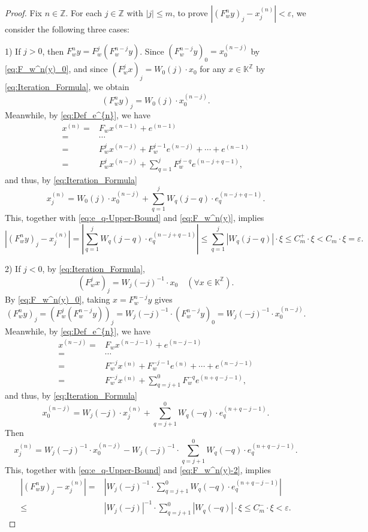 \documentclass[10pt,a4paper]{amsart}
\begin{document}
\begin{proof}
Fix \(n\in\mathbb{Z}\). For each $j\in \mathbb{Z}$ with \(|j|\le m\), to prove
$|(F_w^n y)_j-x^{(n)}_j|<\varepsilon$, we consider the following
three cases:

1)
If \(j>0\), then \(F_w^n y = F_w^j(F_w^{n-j}y)\).
Since \((F_w^{n-j}y)_0 = x^{(n-j)}_0\) by \eqref{eq:F_w^n(y)_0},
and since \((F_w^j x)_j = W_0(j)\cdot x_0\) for any
\(x\in \mathbb{K}^{\mathbb{Z}}\) by \eqref{eq:Iteration_Formula},
we obtain
\begin{equation}\label{eq:F_w^n(y)}
(F_w^n y)_j=W_0(j)\cdot x^{(n-j)}_0.
\end{equation}
Meanwhile, by \eqref{eq:Def_e^{n}}, we have
\begin{align*}
x^{(n)}=& F_{w}x^{(n-1)}+e^{(n-1)}\\
=&
\cdots \\
=& F_{w}^{j}x^{(n-j)}+
F_{w}^{j-1}e^{(n-j)}+\cdots +e^{(n-1)}\\
=& F_{w}^{j}x^{(n-j)}
+\sum_{q=1}^{j}F_{w}^{j-q}e^{(n-j+q-1)},
\end{align*}
and thus, by \eqref{eq:Iteration_Formula}
\[
x^{(n)}_j
=
W_0(j)\cdot x^{(n-j)}_0
+
\sum_{q=1}^{j} W_q(j-q)\cdot e_q^{(n-j+q-1)}.
\]
This, together with \eqref{eq:e_q-Upper-Bound} and \eqref{eq:F_w^n(y)},
implies
\[
\left|(F_w^n y)_j-x^{(n)}_j\right|
=\left|\sum_{q=1}^{j} W_q(j-q)\cdot e_q^{(n-j+q-1)}\right|
\leq \sum_{q=1}^{j}|W_q(j-q)|\cdot \xi
\leq C_{m}^{+}\cdot \xi
< C_{m}\cdot \xi=\varepsilon .
\]

2)
If \(j<0\), by \eqref{eq:Iteration_Formula},
\[
(F_w^{j}x)_j = W_j(-j)^{-1}\cdot x_0
\quad (\forall x\in\mathbb{K}^{\mathbb{Z}}).
\]
By \eqref{eq:F_w^n(y)_0}, taking \(x = F_w^{n-j} y\) gives
\begin{equation}\label{eq:F_w^n(y)-2}
(F_w^{n}y)_j = (F_w^{j}(F_w^{n-j} y))_j = W_j(-j)^{-1}\cdot(F_w^{n-j} y)_0
=W_j(-j)^{-1}\cdot x^{(n-j)}_0.
\end{equation}
Meanwhile, by \eqref{eq:Def_e^{n}}, we have
\begin{align*}
x^{(n-j)}=& F_{w}x^{(n-j-1)}+e^{(n-j-1)}\\
=&
\cdots \\
=& F_{w}^{-j}x^{(n)}+
F_{w}^{-j-1}e^{(n)}+\cdots +e^{(n-j-1)}\\
=& F_{w}^{-j}x^{(n)}
+\sum_{q=j+1}^{0}F_{w}^{-q}e^{(n+q-j-1)},
\end{align*}
and thus, by \eqref{eq:Iteration_Formula}
\[
x^{(n-j)}_0
=
W_j(-j)\cdot x^{(n)}_j
+
\sum_{q=j+1}^{0}W_q(-q)\cdot e_q^{(n+q-j-1)}.
\]
Then
\[
x^{(n)}_j=W_j(-j)^{-1}\cdot x^{(n-j)}_0
-
W_j(-j)^{-1}\cdot \sum_{q=j+1}^{0}W_q(-q)\cdot
e_q^{(n+q-j-1)}.
\]
This, together with \eqref{eq:e_q-Upper-Bound} and \eqref{eq:F_w^n(y)-2},
implies
\begin{align*}
|(F_w^n y)_j-x^{(n)}_j|
=& \left|W_j(-j)^{-1}\cdot \sum_{q=j+1}^{0}W_q(-q)\cdot
e_q^{(n+q-j-1)}\right|\\
\le &
|W_j(-j)|^{-1}\cdot \sum_{q=j+1}^{0}|W_q(-q)|\cdot \xi
\leq C_{m}^{-}\cdot \xi <\varepsilon .
\end{align*}


\end{proof}
\end{document}
